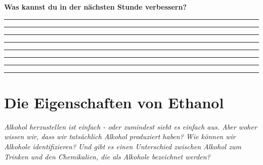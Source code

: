 \documentclass{scrartcl}  %
\begin{document}
\begin{center}
\begin{tcolorbox}
\begin{center}
\begin{tikzpicture}[scale=1]
							\end{tikzpicture}
						\end{center}
						\textbf{{\Large Was kannst du in der nächsten Stunde verbessern?}}
						\begin{center}
							\noindent\rule{12cm}{0.2pt}
							\vspace{1.1cm}
							\noindent\rule{12cm}{0.1pt}
							\vspace{1.1cm}
							\noindent\rule{12cm}{0.1pt}
							\vspace{1.1cm}
							\noindent\rule{12cm}{0.1pt}
							\vspace{1.1cm}
							\noindent\rule{12cm}{0.1pt}
							\vspace{1.1cm}
							\noindent\rule{12cm}{0.1pt}
							\vspace{1.1cm}
							\noindent\rule{12cm}{0.1pt}
							\vspace{1.1cm}
							\noindent\rule{12cm}{0.1pt}
						\end{center}
					\end{tcolorbox}
				\end{center}
								


\newpage

		\section{Die Eigenschaften von Ethanol}

			\textit{Alkohol herzustellen ist einfach - oder zumindest sieht es einfach aus. Aber woher wissen wir, dass wir tatsächlich Alkohol produziert haben? Wie können wir Alkohole identifizieren? Und gibt es einen Unterschied zwischen Alkohol zum Trinken und den Chemikalien, die als Alkohole bezeichnet werden?} \newline
			
\end{document}
